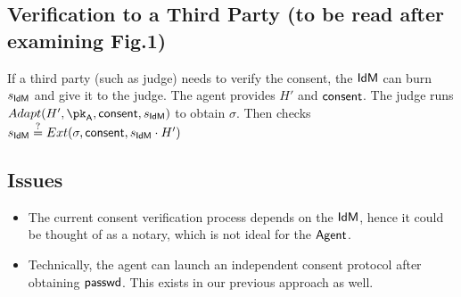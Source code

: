 \documentclass[11pt]{article}
\begin{document}
\pagebreak
\subsection{Verification to a Third Party (to be read after examining Fig.1)}

If a third party (such as judge) needs to verify the consent, the $\textsf{IdM}$ can burn $s_{\textsf{IdM}}$ and give it to the judge. The agent provides $H'$ and $\mathsf{consent}$. The judge runs $Adapt(H', \agentpk, \consent, s_\idm)$ to obtain $\sigma$. Then checks $s_{\textsf{IdM}} \overset{?}{=} Ext(\sigma, \mathsf{consent}, s_{\textsf{IdM}}\cdot H')$

\subsection{Issues}

\begin{itemize}
    \item The current consent verification process depends on the $\textsf{IdM}$, hence it could be thought of as a notary, which is not ideal for the $\textsf{Agent}$.
    \item Technically, the agent can launch an independent consent protocol after obtaining $\textsf{passwd}$. This exists in our previous approach as well.
\end{itemize}
\end{document}
